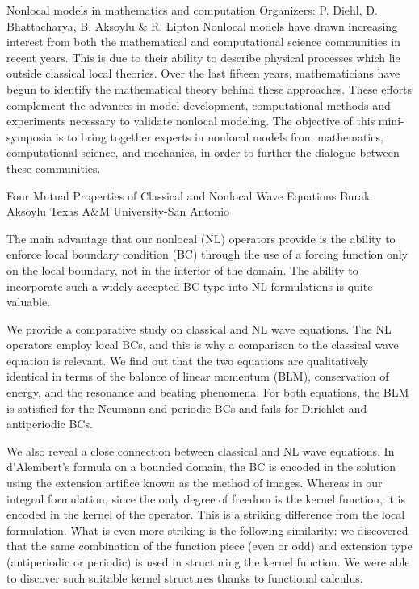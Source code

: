 \label{mini02}

\miniabs
{Nonlocal models in mathematics and computation}
{Organizers: P. Diehl, D. Bhattacharya, B. Aksoylu \& R. Lipton}
{Nonlocal models have drawn increasing interest from both the mathematical and computational science communities in recent years. This is due to their ability to describe physical processes which lie outside classical local theories. Over the last fifteen years, mathematicians have begun to identify the mathematical theory behind these approaches. These efforts complement the advances in model development, computational methods and experiments necessary to validate nonlocal modeling. The objective of this mini-symposia is to bring together experts in nonlocal models from mathematics, computational science, and mechanics, in order to further the dialogue between these communities.}

\vspace{2ex}
\abs
{Four Mutual Properties of Classical and Nonlocal Wave Equations}
{Burak Aksoylu}
{Texas A\&M University-San Antonio}
{The main advantage that our nonlocal (NL) operators provide is the ability to enforce local boundary condition (BC) through the use of a forcing function only on the local boundary, not in the interior of the domain.  The ability to incorporate such a widely accepted BC type into NL formulations is quite valuable. 

We provide a comparative study on classical and NL wave equations.  The NL operators employ local BCs, and this is why a comparison to the classical wave equation is relevant. We find out that the two equations are qualitatively identical in terms of the balance of linear momentum (BLM), conservation of energy, and the resonance and beating phenomena. For both equations, the BLM is satisfied for the Neumann and periodic BCs and fails for Dirichlet and antiperiodic BCs.

We also reveal a close connection between classical and NL wave equations.  In d’Alembert’s formula on a bounded domain, the BC is encoded in the solution using the extension artifice known as the method of images. Whereas in our integral formulation, since the only degree of freedom is the kernel function, it is encoded in the kernel of the operator. This is a striking difference from the local formulation. What is even more striking is the following similarity: we discovered that the same combination of the function piece (even or odd) and extension type (antiperiodic or periodic) is used in structuring the kernel function.  We were able to discover such suitable kernel structures thanks to functional calculus.}


